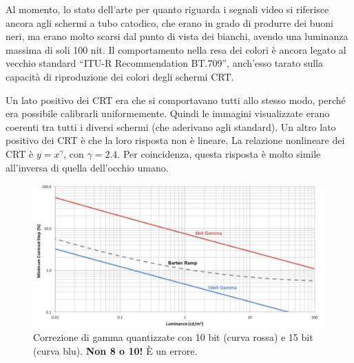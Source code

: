 \documentclass[a4paper,11pt]{article}
\begin{document}
Al momento, lo stato dell'arte per quanto riguarda i segnali video si riferisce ancora agli schermi a tubo catodico, che erano in grado di produrre dei buoni neri,
ma erano molto scarsi dal punto di vista dei bianchi, avendo una luminanza massima di soli 100 nit.
Il comportamento nella resa dei colori è ancora legato al vecchio standard ``ITU-R Recommendation BT.709'', anch'esso tarato sulla capacità di riproduzione dei colori degli schermi CRT.
\par
Un lato positivo dei CRT era che si comportavano tutti allo stesso modo, perché era possibile calibrarli uniformemente. Quindi
le immagini visualizzate erano coerenti tra tutti i diversi schermi (che aderivano agli standard).
Un altro lato positivo dei CRT è che la loro risposta non è lineare.
La relazione nonlineare dei CRT è $y = x^{\gamma}$, con $\gamma = 2.4$. Per coincidenza, questa risposta è molto simile all'inversa di quella dell'occhio umano.

\renewcommand{\thefigure}{4.22}
\begin{figure}[!h]
  \centering
    \includegraphics[scale=0.45]{images/4/gamma_barten.png}
    \caption{Correzione di gamma quantizzate con 10 bit (curva rossa) e 15 bit (curva blu). \textbf{Non 8 o 10!} È un errore.}
\end{figure}
\end{document}
